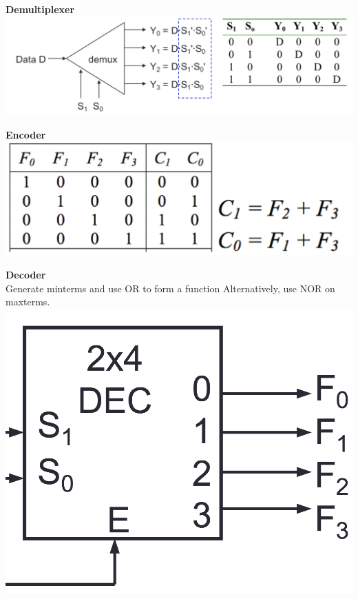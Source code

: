 \documentclass[a4paper]{article} \usepackage[backend=biber, style=numeric, sorting=none]{biblatex}
\begin{document}
\begin{multicols*}{4}
\begin{multicols*}{2}
\textbf{{Demultiplexer}}
\vfill\null
\columnbreak
{\centering \includegraphics[scale=0.16]{demultiplexer}}
\end{multicols*}

\begin{multicols*}{2}
\textbf{{Encoder}}
\vfill\null
\columnbreak
{\centering \includegraphics[scale=0.18]{encoder}}
\end{multicols*}

\begin{multicols*}{2}
\textbf{{Decoder}}
\\ Generate minterms and use OR to form a function
Alternatively, use NOR on maxterms.
\vfill\null
\columnbreak
{\centering \includegraphics[scale=0.13]{decoder}}
\end{multicols*}


\end{multicols*}
\end{document}
